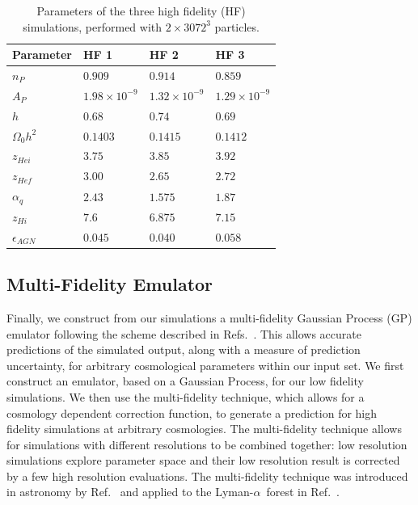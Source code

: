 \documentclass[a4paper,11pt]{article}
\newcommand{\Lya}{Lyman-$\alpha$}
\begin{document}
\begin{table}
\begin{centering}
  \begin{tabular}{llll}
  \hline
  Parameter & HF 1 & HF 2 & HF 3\\
    \hline
    $n_P$  &  $0.909$  & $0.914$ & $0.859$ \\
    $A_P$  &  $1.98 \times 10^{-9}$  & $1.32 \times 10^{-9}$ & $1.29 \times 10^{-9}$\\
    $h$    & $0.68$  & $0.74$ & $0.69$\\
    $\Omega_0 h^2$ & $0.1403$ & $0.1415$ & $0.1412$\\
    $z_{Hei}$      & $3.75$  & $3.85$  & $ 3.92$ \\
    $z_{Hef}$      & $3.00$  & $2.65$  & $2.72$\\
    $\alpha_q$     & $2.43$  & $1.575$ & $ 1.87$ \\
    $z_{Hi}$        & $7.6$ & $6.875$   & $7.15 $\\
    $\epsilon_{AGN}$ & $0.045$ & $0.040$ & $ 0.058$\\
    \hline
  \end{tabular}
  \caption{Parameters of the three high fidelity (HF) simulations, performed with $2\times 3072^3$ particles.}
  \label{tab:highfidelity}
  \end{centering}
\end{table}

\subsection{Multi-Fidelity Emulator}

Finally, we construct from our simulations a multi-fidelity Gaussian Process (GP) emulator following the scheme described in Refs.~\cite{Bird:2019, Fernandez:2022}.
This allows accurate predictions of the simulated output, along with a measure of prediction uncertainty, for arbitrary cosmological parameters within our input set. We first construct an emulator, based on a Gaussian Process, for our low fidelity simulations. We then use the multi-fidelity technique, which allows for a cosmology dependent correction function, to generate a prediction for high fidelity simulations at arbitrary cosmologies.
The multi-fidelity technique allows for simulations with different resolutions to be combined together: low resolution simulations explore parameter space and their low resolution result is corrected by a few high resolution evaluations. The multi-fidelity technique was introduced in astronomy by Ref.~\cite{Ho:2022} and applied to the \Lya~forest in Ref.~\cite{Fernandez:2022}.
\end{document}
